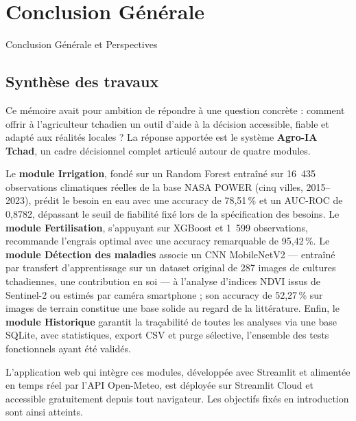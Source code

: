 
\chapter*{Conclusion Générale}
{Conclusion Générale et Perspectives}

\section*{Synthèse des travaux}

Ce mémoire avait pour ambition de répondre à une question
concrète : comment offrir à l'agriculteur tchadien un outil
d'aide à la décision accessible, fiable et adapté aux réalités
locales ? La réponse apportée est le système \textbf{Agro-IA
	Tchad}, un cadre décisionnel complet articulé autour de quatre
modules.

\medskip

Le \textbf{module Irrigation}, fondé sur un Random Forest
entraîné sur 16~435 observations climatiques réelles de la base
NASA POWER (cinq villes, 2015--2023), prédit le besoin en eau
avec une accuracy de 78,51\,\% et un AUC-ROC de 0,8782,
dépassant le seuil de fiabilité fixé lors de la spécification
des besoins. Le \textbf{module Fertilisation}, s'appuyant sur
XGBoost et 1~599 observations, recommande l'engrais optimal avec
une accuracy remarquable de 95,42\,\%. Le \textbf{module
	Détection des maladies} associe un CNN MobileNetV2 --- entraîné
par transfert d'apprentissage sur un dataset original de 287
images de cultures tchadiennes, une contribution en soi --- à
l'analyse d'indices NDVI issus de Sentinel-2 ou estimés par
caméra smartphone ; son accuracy de 52,27\,\% sur images de
terrain constitue une base solide au regard de la littérature.
Enfin, le \textbf{module Historique} garantit la traçabilité de
toutes les analyses via une base SQLite, avec statistiques,
export CSV et purge sélective, l'ensemble des tests fonctionnels
ayant été validés.

\medskip

L'application web qui intègre ces modules, développée avec
Streamlit et alimentée en temps réel par l'API Open-Meteo, est
déployée sur Streamlit Cloud et accessible gratuitement depuis
tout navigateur. Les objectifs fixés en introduction sont ainsi
atteints.

